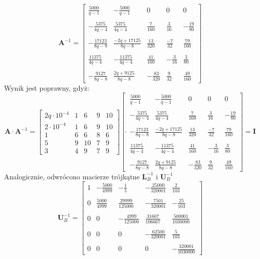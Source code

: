 \documentclass[a4paper]{article}
\begin{document}
$$
\textbf{A}^{-1}=
\left[
\begin{array}
{ccccc}
\frac{5000}{q-1}&-\frac{5000}{q-1}&0&0&0\\ \\
-\frac{5375}{4q-4}&\frac{5375}{4q-4}&\frac{7}{160}&\frac{3}{16}&-\frac{19}{80}\\ \\
-\frac{17123}{8q-8}&\frac{-2q+17125}{8q-8}&\frac{13}{320}&\frac{-7}{32}&\frac{79}{160}\\ \\
\frac{11375}{4q-4}&-\frac{11375}{4q-4}&\frac{41}{160}&-\frac{3}{16}&\frac{3}{80}\\ \\
-\frac{9127}{8q-8}&\frac{2q+9125}{8q-8}&-\frac{83}{320}&\frac{9}{32}&\frac{49}{160}
\end{array}
\right]
$$
Wynik jest poprawny, gdyż:
$$
\textbf{A}\cdot \textbf{A}^{-1} =
\left[
\begin{array}{ccccc}
2q\cdot 10^{-4} & 1&6&9&10\\
2\cdot 10^{-4}&1&6&9&10\\
1&6&6&8&6\\
5&9&10&7&9\\
3&4&9&7&9
\end{array}
\right]
 \left[
\cdot
\begin{array}
{ccccc}
\frac{5000}{q-1}&-\frac{5000}{q-1}&0&0&0\\ \\
-\frac{5375}{4q-4}&\frac{5375}{4q-4}&\frac{7}{160}&\frac{3}{16}&-\frac{19}{80}\\ \\
-\frac{17123}{8q-8}&\frac{-2q+17125}{8q-8}&\frac{13}{320}&\frac{-7}{32}&\frac{79}{160}\\ \\
\frac{11375}{4q-4}&-\frac{11375}{4q-4}&\frac{41}{160}&-\frac{3}{16}&\frac{3}{80}\\ \\
-\frac{9127}{8q-8}&\frac{2q+9125}{8q-8}&-\frac{83}{320}&\frac{9}{32}&\frac{49}{160}
\end{array}
\right]
=\textbf{I}
$$
Analogicznie, odwrócono macierze trójkątne $\textbf{L}_{B}^{-1}$ i $\textbf{U}_{B}^{-1}$
$$
\textbf{U}_{B}^{-1}=
\left[
\begin{array}
{ccccc}
1&-\frac{5000}{4999}&-\frac{1}{5}&-\frac{25000}{320001}&\frac{2}{103}\\ \\
0&\frac{5000}{4999}&\frac{29999}{125000}&-\frac{7501}{320001}&-\frac{25}{103} \\ \\
0&0&-\frac{4999}{125000}&\frac{31667}{106667}&\frac{500001}{1030000}\\ \\
0&0&0&-\frac{62500}{320001}&\frac{5}{103}\\ \\
0&0&0&0&-\frac{320001}{1030000}
\end{array}
\right]
$$
\end{document}
